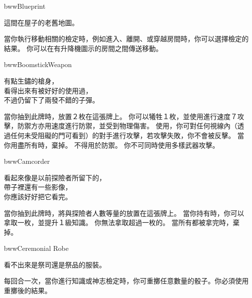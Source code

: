 %
\begin{ItemCard}{bww}{Blueprint}{}
	\begin{CardStory}
		這間在屋子的老舊地圖。
	\end{CardStory}
	當你執行移動相關的檢定時，例如進入、離開、或穿越房間時，你可以選擇檢定的結果。\smallbreak
	你可以在有升降機圖示的房間之間傳送移動。\smallbreak
\end{ItemCard}%
\linebreak[0]%
\begin{ItemCard}{bww}{Boomstick}{Weapon}
	\begin{CardStory}
		有點生鏽的槍身，\\
		看得出來有被好好的使用過，\\
		不過仍留下了兩發不錯的子彈。
	\end{CardStory}
	當你抽到此牌時，放置２枚在這張牌上。\smallbreak
	你可以犧牲１枚，並使用\ThisName{}進行速度７攻擊，防禦方亦用速度進行防禦，並受到物理傷害。\smallbreak
	使用\ThisName{}，你可對任何視線內（透過任何未受阻礙的門可看到）的對手進行攻擊，若攻擊失敗，你不會被反擊。\smallbreak
	當你用盡所有時，棄掉\ThisName{}。\smallbreak
	\ThisName{}不得用於防禦。\smallbreak
	你不可同時使用多樣武器攻擊。\smallbreak
\end{ItemCard}%
\linebreak[0]%
\begin{ItemCard}{bww}{Camcorder}{}
	\begin{CardStory}
		看起來像是以前探險者所留下的，\\
		帶子裡還有一些影像，\\
		你應該好好把它看完。
	\end{CardStory}
	當你抽到此牌時，將與探險者人數等量的放置在這張牌上。\smallbreak
	當你持有\ThisName{}時，你可以拿取一枚，並提升１級知識。\smallbreak
	你無法拿取超過一枚的。\smallbreak
	當所有都被拿完時，棄掉\ThisName{}。\smallbreak
\end{ItemCard}%
\linebreak[0]%
\begin{ItemCard}{bww}{Ceremonial Robe}{}
	\begin{CardStory}
		看不出來是祭司還是祭品的服裝。
	\end{CardStory}
	每回合一次，當你進行知識或神志檢定時，你可重擲任意數量的骰子。你必須使用重擲後的結果。\smallbreak
\end{ItemCard}%
\linebreak[0]%
